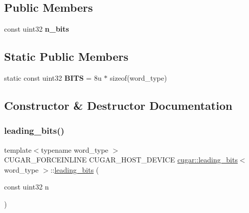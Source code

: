 \subsection*{Public Members}
\begin{DoxyCompactItemize}
\item 
\mbox{\label{structcugar_1_1leading__bits_a58d7725ea45c08982d6a24b63b78053b}} 
const uint32 {\bfseries n\+\_\+bits}
\end{DoxyCompactItemize}
\subsection*{Static Public Members}
\begin{DoxyCompactItemize}
\item 
\mbox{\label{structcugar_1_1leading__bits_a9e560a60dccd3f0392117f044b429504}} 
static const uint32 {\bfseries B\+I\+TS} = 8u $\ast$ sizeof(word\+\_\+type)
\end{DoxyCompactItemize}


\subsection{Constructor \& Destructor Documentation}
\mbox{\label{structcugar_1_1leading__bits_ad6af66423d99cd96d71bc96aba0d8bf0}} 
\subsubsection{\texorpdfstring{leading\+\_\+bits()}{leading\_bits()}}
{\footnotesize\ttfamily template$<$typename word\+\_\+type $>$ \\
C\+U\+G\+A\+R\+\_\+\+F\+O\+R\+C\+E\+I\+N\+L\+I\+NE C\+U\+G\+A\+R\+\_\+\+H\+O\+S\+T\+\_\+\+D\+E\+V\+I\+CE \hyperlink{structcugar_1_1leading__bits}{cugar\+::leading\+\_\+bits}$<$ word\+\_\+type $>$\+::\hyperlink{structcugar_1_1leading__bits}{leading\+\_\+bits} (\begin{DoxyParamCaption}\item[{const uint32}]{n }\end{DoxyParamCaption})\hspace{0.3cm}{\ttfamily [inline]}}

